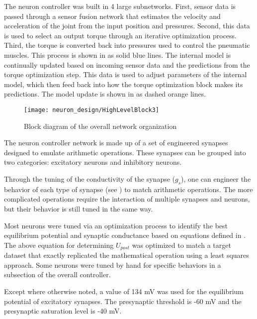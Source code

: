 The neuron controller was built in 4 large subnetworks. First, sensor data is passed through a sensor fusion network that estimates the velocity and acceleration of the joint from the input position and pressures. Second, this data is used to select an output torque through an iterative optimization process. Third, the torque is converted back into pressures used to control the pneumatic muscles. This process is shown in  as solid blue lines. The internal model is continually updated based on incoming sensor data and the predictions from the torque optimization step. This data is used to adjust parameters of the internal model, which then feed back into how the torque optimization block makes its predictions. The model update is shown in  as dashed orange lines.

\begin{figure}
\centering
\texttt{[image: neuron\_design/HighLevelBlock3]}
\caption{Block diagram of the overall network organization}
\label{fig:HighLevelBlock}
\end{figure}

\label{sec:key_synapses}

The neuron controller network is made up of a set of engineered synapses
designed to emulate arithmetic operations. These synapses can be grouped into two
categories: excitatory neurons and inhibitory neurons.

Through the tuning of the conductivity of the synapse ($g_{s}$), one can engineer the behavior of each type of synapse (see ) to match arithmetic operations. The more complicated operations require the interaction of multiple synapses and neurons, but their behavior is still tuned in the same way.

Most neurons were tuned
via an optimization process to identify the best equilibrium potential and
synaptic conductance based on equations defined in 
\cite{NickFunctionalSubnetwork}. The above equation for determining $U_{post}$ was optimized to match a target dataset that exactly replicated the mathematical operation using a least squares approach.
Some neurons were tuned by hand for specific behaviors in
a subsection of the overall controller.


Except where otherwise noted, a value of 134 mV was used for the equilibrium
potential of excitatory synapses. The presynaptic threshold is -60 mV and the presynaptic saturation
level is -40 mV.

